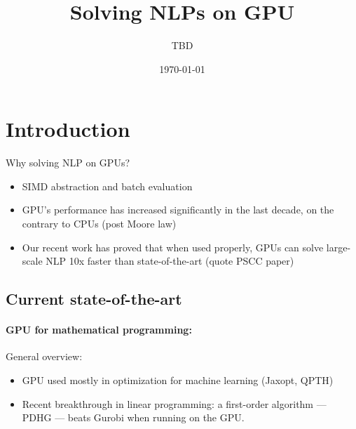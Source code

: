 \documentclass{article}
\title{Solving NLPs on GPU}
\author{TBD}
\date{\today}
\theoremstyle{definition}
\theoremstyle{remark}
\begin{document}
\maketitle

\tableofcontents

\section{Introduction}
Why solving NLP on GPUs?
\begin{itemize}
  \item SIMD abstraction and batch evaluation
  \item GPU's performance has increased significantly in the last decade, on the contrary to CPUs (post Moore law)
  \item Our recent work has proved that when used properly,
    GPUs can solve large-scale NLP 10x faster than state-of-the-art (quote PSCC paper)
\end{itemize}


\subsection{Current state-of-the-art}

\paragraph{GPU for mathematical programming:}
General overview:
\begin{itemize}
  \item GPU used mostly in optimization for machine learning (Jaxopt, QPTH)
  \item Recent breakthrough in linear programming: a first-order
    algorithm --- PDHG --- beats Gurobi when running on the GPU.
\end{itemize}
\end{document}
